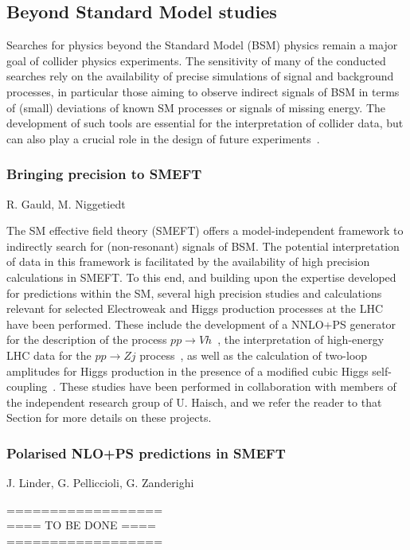 \documentclass{FBR_Bericht_2025}
\begin{document}
\subsection{Beyond Standard Model studies}
\begin{refsection}
Searches for physics beyond the Standard Model (BSM) physics remain a major goal of collider physics experiments.
The sensitivity of many of the conducted searches rely on the availability of precise simulations of signal and background processes, in particular those aiming to observe indirect signals of BSM in terms of (small) deviations of known SM processes or signals of missing energy. 
The development of such tools are essential for the interpretation of collider data, but can also play a crucial role in the design of future experiments~\cite{Bechtle:2024atq}.
%
\subsubsection{Bringing precision to SMEFT}
\begin{Namen}
R. Gauld, M. Niggetiedt%
\end{Namen}
The SM effective field theory (SMEFT) offers a model-independent framework to indirectly search for (non-resonant) signals of BSM.
The potential interpretation of data in this framework is facilitated by the availability of high precision calculations in SMEFT.
To this end, and building upon the expertise developed for predictions within the SM, several high precision studies and calculations relevant for selected Electroweak and Higgs production processes at the LHC have been performed.
These include the development of a NNLO+PS generator for the description of the process $pp\to Vh$~\cite{Gauld:2023gtb}, the interpretation of high-energy LHC data for the $pp\to Zj$ process~\cite{Gauld:2024glt}, as well as the calculation of two-loop amplitudes for Higgs production in the presence of a modified cubic Higgs self-coupling~\cite{Haisch:2024nzv}.
These studies have been performed in collaboration with members of the independent research group of U. Haisch, and we refer the reader to that Section for more details on these projects.
%
\subsubsection{Polarised NLO+PS predictions in SMEFT}
\begin{Namen}
J. Linder, G. Pelliccioli, G. Zanderighi
\end{Namen}
%
{\color{red} ==================\\ ====\; TO BE DONE\; ====\\ ==================}
%

\end{refsection}
\end{document}

